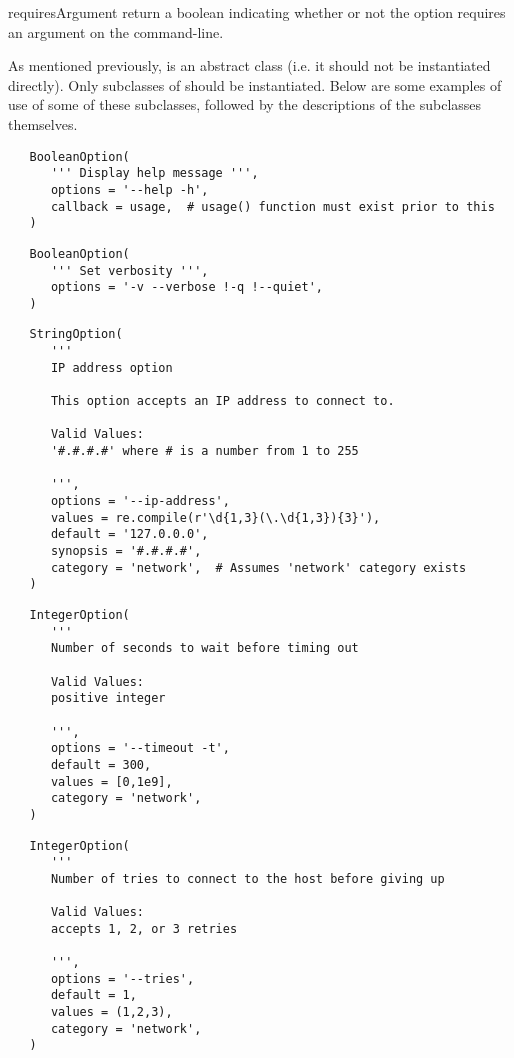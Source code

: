 \begin{methoddesc}[GenericOption]{requiresArgument}{}
return a boolean indicating whether or not the option requires an argument
on the command-line.
\end{methoddesc}

As mentioned previously,  is an abstract class 
(i.e. it should not be instantiated directly).  Only subclasses of 
 should be instantiated.  Below are some examples
of use of some of these subclasses, followed by the descriptions
of the subclasses themselves.

\begin{verbatim}
   BooleanOption(
      ''' Display help message ''',
      options = '--help -h',
      callback = usage,  # usage() function must exist prior to this
   )
\end{verbatim}

\begin{verbatim}
   BooleanOption(
      ''' Set verbosity ''',
      options = '-v --verbose !-q !--quiet',
   )
\end{verbatim}

\begin{verbatim}
   StringOption(
      '''
      IP address option

      This option accepts an IP address to connect to.

      Valid Values:
      '#.#.#.#' where # is a number from 1 to 255

      ''',
      options = '--ip-address',
      values = re.compile(r'\d{1,3}(\.\d{1,3}){3}'),
      default = '127.0.0.0',
      synopsis = '#.#.#.#',
      category = 'network',  # Assumes 'network' category exists
   )
\end{verbatim}

\begin{verbatim}
   IntegerOption(
      '''
      Number of seconds to wait before timing out

      Valid Values:
      positive integer

      ''',
      options = '--timeout -t',
      default = 300,
      values = [0,1e9],
      category = 'network',
   )
\end{verbatim}

\begin{verbatim}
   IntegerOption(
      '''
      Number of tries to connect to the host before giving up

      Valid Values:
      accepts 1, 2, or 3 retries

      ''',
      options = '--tries',
      default = 1,
      values = (1,2,3),
      category = 'network',
   )
\end{verbatim}

